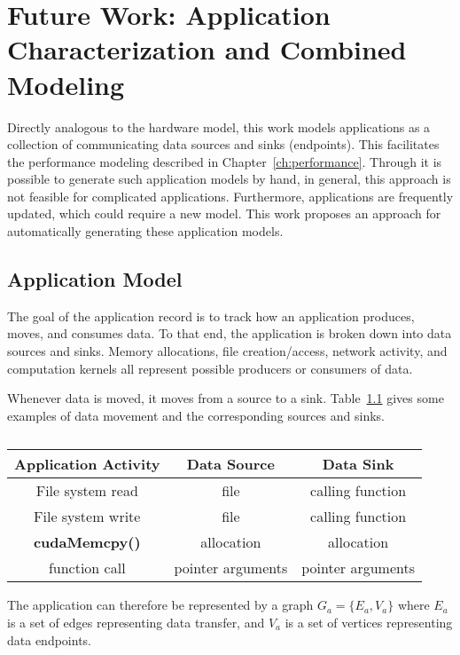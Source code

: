\chapter{Future Work: Application Characterization and Combined Modeling}
\label{ch:future}

Directly analogous to the hardware model, this work models applications as a collection of communicating data sources and sinks (endpoints).
This facilitates the performance modeling described in Chapter~\ref{ch:performance}.
Through it is possible to generate such application models by hand, in general, this approach is not feasible for complicated applications.
Furthermore, applications are frequently updated, which could require a new model.
This work proposes an approach for automatically generating these application models.

\section{Application Model}

The goal of the application record is to track how an application produces, moves, and consumes data.
To that end, the application is broken down into data sources and sinks.
Memory allocations, file creation/access, network activity, and computation kernels all represent possible producers or consumers of data.

Whenever data is moved, it moves from a source to a sink.
Table~\ref{tab:source-sink-example} gives some examples of data movement and the corresponding sources and sinks.

\begin{table}[h]
    \centering
    \caption{}
    \label{tab:source-sink-example}
    \begin{tabular}{|c|c|c|}
    \hline
    \textbf{Application Activity} & \textbf{Data Source} & \textbf{Data Sink} \\ \hline
    File system read  & file & calling function \\ \hline
    File system write  & file & calling function \\ \hline
    \textbf{cudaMemcpy()} & allocation & allocation \\ \hline
    function call & pointer arguments & pointer arguments \\ \hline
    \end{tabular}
\end{table}

The application can therefore be represented by a graph $G_a = \{E_a,V_a\}$ where $E_a$ is a set of edges representing data transfer, and $V_a$ is a set of vertices representing data endpoints.

